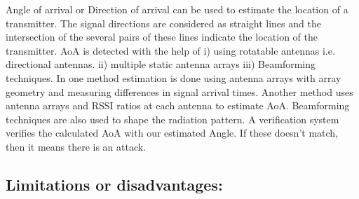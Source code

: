 Angle of arrival or Direction of arrival can be used to estimate the location of a transmitter. The signal directions are considered as straight lines and the intersection of the several pairs of these lines indicate the location of the transmitter. AoA is detected with the help of i) using rotatable antennas i.e. directional antennas. ii) multiple static antenna arrays iii) Beamforming techniques. In one method estimation is done using antenna arrays with array geometry and measuring differences in signal arrival times. Another method uses antenna arrays and RSSI ratios at each antenna to estimate AoA. Beamforming techniques are also used to shape the radiation pattern. 
A verification system verifies the calculated AoA with our estimated Angle. If these doesn’t match, then it means there is an attack.

\subsection{Limitations or disadvantages:} \label{rss_limitations}


